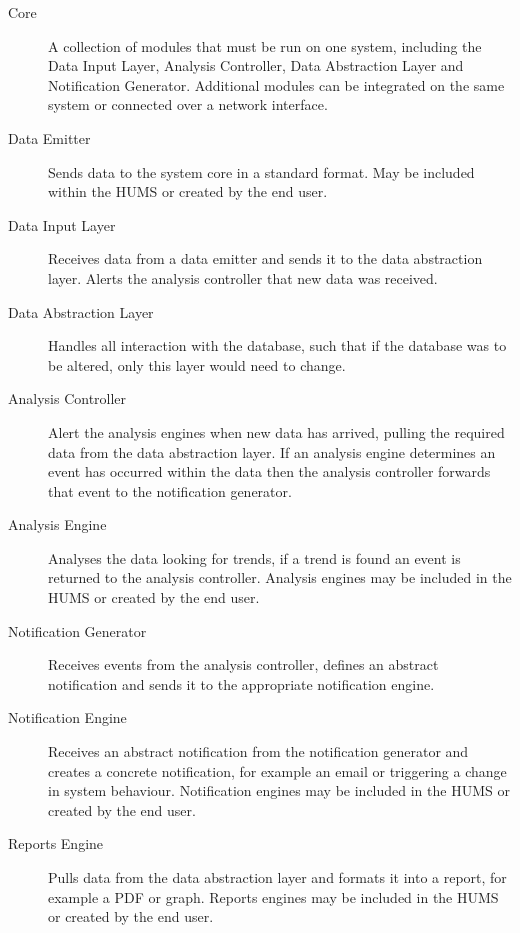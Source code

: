 \documentclass[10pt,a4paper]{article}
\begin{document}
\begin{description}
  \item[Core] A collection of modules that must be run on one system, including the Data Input Layer, Analysis Controller, Data Abstraction Layer and Notification Generator. Additional modules can be integrated on the same system or connected over a network interface.

  \item[Data Emitter] Sends data to the system core in a standard
    format. May be included within the HUMS or created by the end
    user.

  \item[Data Input Layer] Receives data from a data emitter and sends
    it to the data abstraction layer. Alerts the analysis controller
    that new data was received.

  \item[Data Abstraction Layer] Handles all interaction with the
    database, such that if the database was to be altered, only this
    layer would need to change.

  \item[Analysis Controller] Alert the analysis engines when new data
    has arrived, pulling the required data from the data abstraction
    layer. If an analysis engine determines an event has occurred
    within the data then the analysis controller forwards that event
    to the notification generator.

  \item[Analysis Engine] Analyses the data looking for trends, if a
    trend is found an event is returned to the analysis
    controller. Analysis engines may be included in the HUMS or
    created by the end user.

  \item[Notification Generator] Receives events from the analysis
    controller, defines an abstract notification and sends it to the
    appropriate notification engine.

  \item[Notification Engine] Receives an abstract notification from
    the notification generator and creates a concrete notification,
    for example an email or triggering a change in system
    behaviour. Notification engines may be included in the HUMS or
    created by the end user.

  \item[Reports Engine] Pulls data from the data abstraction layer and
    formats it into a report, for example a PDF or graph. Reports
    engines may be included in the HUMS or created by the end user.
\end{description}
\end{document}
